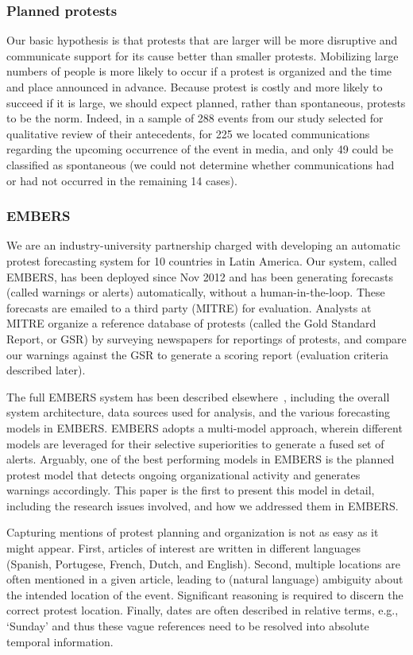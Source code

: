 \subsubsection{Planned protests}
Our basic hypothesis is that
protests that are larger will be more disruptive and communicate support for its cause better than smaller protests. 
Mobilizing large numbers of people is more likely to occur if a protest is organized and the time and place announced in
advance. Because protest is costly and more likely to succeed if it is large, we should expect planned, rather than 
spontaneous, protests to be the norm. Indeed, in a sample of 288 events from our study selected for qualitative review of their antecedents,
for 225 we located communications regarding the upcoming occurrence of the event in media, and only 49 could be classified as 
spontaneous (we could not determine whether communications had or had not occurred in the remaining 14 cases).

\subsubsection{EMBERS}
We are an industry-university partnership charged with developing an
automatic protest forecasting system for 10 countries in
Latin America. Our system, called EMBERS, has been
deployed since Nov 2012 and has been generating forecasts (called
warnings or alerts) automatically, without a human-in-the-loop. These forecasts are emailed to
a third party (MITRE) for evaluation. Analysts at MITRE organize a reference
database of protests (called the Gold Standard Report,
or GSR) by surveying newspapers for reportings of protests, and
compare our warnings against the GSR to generate a scoring report (evaluation
criteria described later).

The full EMBERS system has been described elsewhere~\cite{emberskdd}, including
the overall system architecture, data sources used for analysis, and the
various forecasting models in EMBERS. EMBERS adopts a multi-model approach,
wherein different models are leveraged for their selective superiorities
to generate a fused set of alerts. Arguably, one of the
best performing models in EMBERS is the planned protest model that detects
ongoing organizational activity and generates warnings accordingly. This paper
is the first to present this model in detail, including the 
research issues involved, and how we addressed them in EMBERS.

Capturing mentions of protest planning and organization 
is not as easy as it might appear. First, articles of interest are written in
different languages (Spanish, Portugese, French, Dutch, and English). 
Second, multiple locations are often mentioned in a given article, leading
to (natural language) ambiguity about the intended location of the event.
Significant reasoning is required to discern the correct protest location.
Finally, dates are often described in relative terms, e.g., `Sunday' and 
thus these vague references need to be resolved into absolute temporal
information. 

